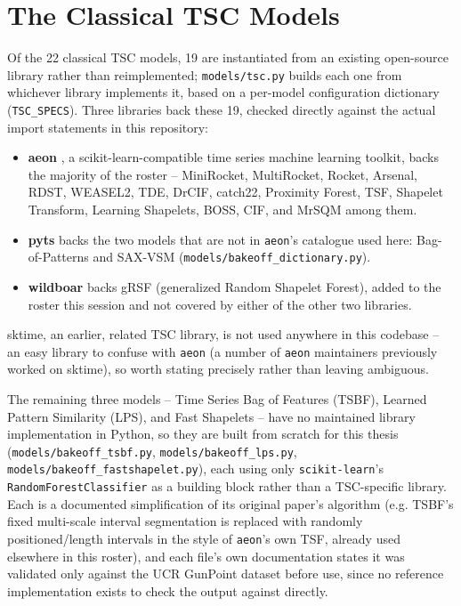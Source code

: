 \section{The Classical TSC Models}
\label{sec:tsc_libraries}

Of the 22 classical TSC models, 19 are instantiated from an existing open-source library rather than reimplemented; \texttt{models/tsc.py} builds each one from whichever library implements it, based on a per-model configuration dictionary (\texttt{TSC\_SPECS}). Three libraries back these 19, checked directly against the actual import statements in this repository:

\begin{itemize}
    \item \textbf{aeon} \citep{aeon2024}, a scikit-learn-compatible time series machine learning toolkit, backs the majority of the roster -- MiniRocket, MultiRocket, Rocket, Arsenal, RDST, WEASEL2, TDE, DrCIF, catch22, Proximity Forest, TSF, Shapelet Transform, Learning Shapelets, BOSS, CIF, and MrSQM among them.
    \item \textbf{pyts} \citep{pyts2020} backs the two models that are not in \texttt{aeon}'s catalogue used here: Bag-of-Patterns and SAX-VSM (\texttt{models/bakeoff\_dictionary.py}).
    \item \textbf{wildboar} backs gRSF (generalized Random Shapelet Forest), added to the roster this session and not covered by either of the other two libraries.
\end{itemize}

sktime, an earlier, related TSC library, is not used anywhere in this codebase -- an easy library to confuse with \texttt{aeon} (a number of \texttt{aeon} maintainers previously worked on sktime), so worth stating precisely rather than leaving ambiguous.

The remaining three models -- Time Series Bag of Features (TSBF), Learned Pattern Similarity (LPS), and Fast Shapelets -- have no maintained library implementation in Python, so they are built from scratch for this thesis (\texttt{models/bakeoff\_tsbf.py}, \texttt{models/bakeoff\_lps.py}, \texttt{models/bakeoff\_fastshapelet.py}), each using only \texttt{scikit-learn}'s \texttt{RandomForestClassifier} \citep{pedregosa2011sklearn} as a building block rather than a TSC-specific library. Each is a documented simplification of its original paper's algorithm (e.g. TSBF's fixed multi-scale interval segmentation is replaced with randomly positioned/length intervals in the style of \texttt{aeon}'s own TSF, already used elsewhere in this roster), and each file's own documentation states it was validated only against the UCR GunPoint dataset before use, since no reference implementation exists to check the output against directly.

